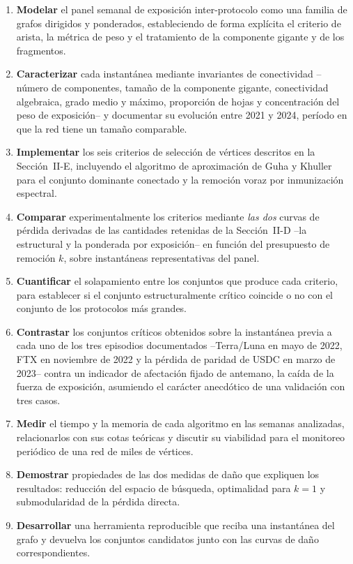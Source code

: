 \documentclass[journal]{IEEEtran}
\begin{document}
\begin{enumerate}
\item \textbf{Modelar} el panel semanal de exposición inter-protocolo como una
      familia de grafos dirigidos y ponderados, estableciendo de forma explícita
      el criterio de arista, la métrica de peso y el tratamiento de la
      componente gigante y de los fragmentos.

\item \textbf{Caracterizar} cada instantánea mediante invariantes de conectividad
      --número de componentes, tamaño de la componente gigante, conectividad
      algebraica, grado medio y máximo, proporción de hojas y concentración del
      peso de exposición-- y documentar su evolución entre 2021 y 2024, período
      en que la red tiene un tamaño comparable.

\item \textbf{Implementar} los seis criterios de selección de vértices descritos
      en la Sección~II-E, incluyendo el algoritmo de aproximación de Guha y
      Khuller para el conjunto dominante conectado y la remoción voraz por
      inmunización espectral.

\item \textbf{Comparar} experimentalmente los criterios mediante \emph{las dos}
      curvas de pérdida derivadas de las cantidades retenidas de la
      Sección~II-D --la estructural y la ponderada por exposición-- en
      función del presupuesto de remoción $k$, sobre instantáneas representativas
      del panel.

\item \textbf{Cuantificar} el solapamiento entre los conjuntos que produce cada
      criterio, para establecer si el conjunto estructuralmente crítico coincide
      o no con el conjunto de los protocolos más grandes.

\item \textbf{Contrastar} los conjuntos críticos obtenidos sobre la instantánea
      previa a cada uno de los tres episodios documentados --Terra/Luna en mayo de
      2022, FTX en noviembre de 2022 y la pérdida de paridad de USDC en marzo de
      2023-- contra un indicador de afectación fijado de antemano, la caída de
      la fuerza de exposición, asumiendo el carácter anecdótico de una
      validación con tres casos.

\item \textbf{Medir} el tiempo y la memoria de cada algoritmo en las semanas
      analizadas, relacionarlos con sus cotas teóricas y discutir su viabilidad
      para el monitoreo periódico de una red de miles de vértices.

\item \textbf{Demostrar} propiedades de las dos medidas de daño que expliquen
      los resultados: reducción del espacio de búsqueda, optimalidad para
      $k=1$ y submodularidad de la pérdida directa.

\item \textbf{Desarrollar} una herramienta reproducible que reciba una
      instantánea del grafo y devuelva los conjuntos candidatos junto con las
      curvas de daño correspondientes.
\end{enumerate}
\end{document}
